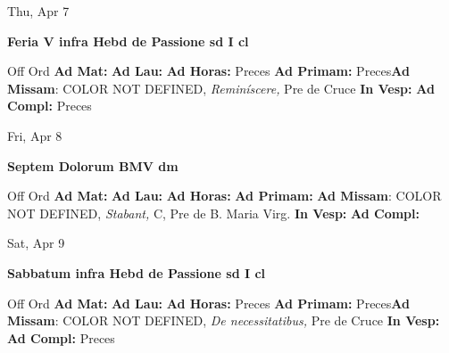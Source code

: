\documentclass[10pt]{memoir}
\begin{document}
\begin{center}
\begin{minipage}{3.5in}
\vspace{2em}
\begin{center}Thu, Apr 7
\end{center}
\textbf{ \large Feria V infra Hebd de Passione
\textnormal{\normalsize sd I cl}}

\begin{justify}Off Ord
\textbf{Ad Mat: }
\textbf{Ad Lau: }
\textbf{Ad Horas: }Preces
\textbf{Ad Primam: }Preces\textbf{Ad Missam}: COLOR NOT DEFINED, \textit{Reminíscere,} Pre de Cruce
\textbf{In Vesp: }
\textbf{Ad Compl: }Preces
\end{justify}
\end{minipage}
\end{center}

\begin{center}
\begin{minipage}{3.5in}
\vspace{2em}
\begin{center}Fri, Apr 8
\end{center}
\textbf{ \large Septem Dolorum BMV
\textnormal{\normalsize dm}}

\begin{justify}Off Ord
\textbf{Ad Mat: }
\textbf{Ad Lau: }
\textbf{Ad Horas: }
\textbf{Ad Primam: }\textbf{Ad Missam}: COLOR NOT DEFINED, \textit{Stabant,} C, Pre de B. Maria Virg.
\textbf{In Vesp: }
\textbf{Ad Compl: }
\end{justify}
\end{minipage}
\end{center}

\begin{center}
\begin{minipage}{3.5in}
\vspace{2em}
\begin{center}Sat, Apr 9
\end{center}
\textbf{ \large Sabbatum infra Hebd de Passione
\textnormal{\normalsize sd I cl}}

\begin{justify}Off Ord
\textbf{Ad Mat: }
\textbf{Ad Lau: }
\textbf{Ad Horas: }Preces
\textbf{Ad Primam: }Preces\textbf{Ad Missam}: COLOR NOT DEFINED, \textit{De necessitatibus,} Pre de Cruce
\textbf{In Vesp: }
\textbf{Ad Compl: }Preces
\end{justify}
\end{minipage}
\end{center}
\end{document}
